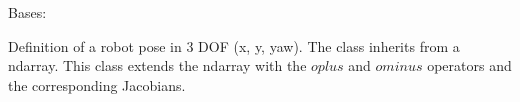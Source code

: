 \documentclass[letterpaper,10pt,english]{sphinxmanual}
\begin{document}
\begin{fulllineitems}
\label{\detokenize{Pose:Pose.Pose3D}}
\pysigstartsignatures
{}
\pysigstopsignatures
\sphinxAtStartPar
Bases: {\hyperref[\detokenize{Pose:Pose.Pose}]{}}

\sphinxAtStartPar
Definition of a robot pose in 3 DOF (x, y, yaw). The class inherits from a ndarray.
This class extends the ndarray with the \(oplus\) and \(ominus\) operators and the corresponding Jacobians.

\begin{fulllineitems}
\label{\detokenize{Pose:Pose.Pose3D.__init__}}
\pysigstartsignatures
{}
\pysigstopsignatures
\end{fulllineitems}



\end{fulllineitems}
\end{document}
